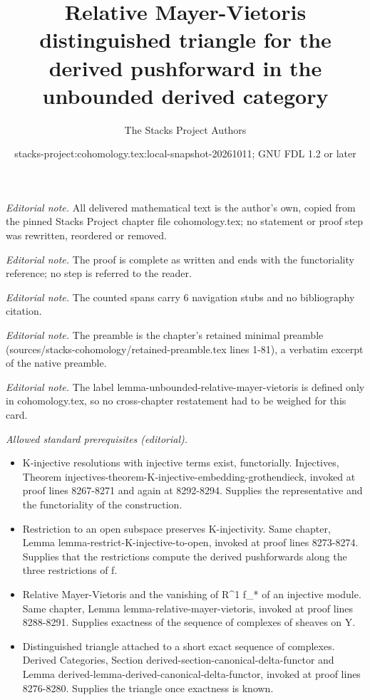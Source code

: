 \documentclass[10pt,a4paper]{amsart}
\title{Relative Mayer-Vietoris distinguished triangle for the derived pushforward in the unbounded derived category}
\author{The Stacks Project Authors}
\date{stacks-project:cohomology.tex:local-snapshot-20261011; GNU FDL 1.2 or later}
\theoremstyle{plain}
\theoremstyle{definition}
\theoremstyle{remark}
\numberwithin{equation}{subsection}
\begin{document}
\maketitle
\noindent\textit{Editorial note.} All delivered mathematical text is the author's own, copied from the pinned Stacks Project chapter file cohomology.tex; no statement or proof step was rewritten, reordered or removed.\par\medskip
\noindent\textit{Editorial note.} The proof is complete as written and ends with the functoriality reference; no step is referred to the reader.\par\medskip
\noindent\textit{Editorial note.} The counted spans carry 6 navigation stubs and no bibliography citation.\par\medskip
\noindent\textit{Editorial note.} The preamble is the chapter's retained minimal preamble (sources/stacks-cohomology/retained-preamble.tex lines 1-81), a verbatim excerpt of the native preamble.\par\medskip
\noindent\textit{Editorial note.} The label lemma-unbounded-relative-mayer-vietoris is defined only in cohomology.tex, so no cross-chapter restatement had to be weighed for this card.\par\medskip
\noindent\textit{Allowed standard prerequisites (editorial).}\begin{itemize}
\item K-injective resolutions with injective terms exist, functorially. Injectives, Theorem injectives-theorem-K-injective-embedding-grothendieck, invoked at proof lines 8267-8271 and again at 8292-8294. Supplies the representative and the functoriality of the construction.
\item Restriction to an open subspace preserves K-injectivity. Same chapter, Lemma lemma-restrict-K-injective-to-open, invoked at proof lines 8273-8274. Supplies that the restrictions compute the derived pushforwards along the three restrictions of f.
\item Relative Mayer-Vietoris and the vanishing of R\textasciicircum{}1 f\_* of an injective module. Same chapter, Lemma lemma-relative-mayer-vietoris, invoked at proof lines 8288-8291. Supplies exactness of the sequence of complexes of sheaves on Y.
\item Distinguished triangle attached to a short exact sequence of complexes. Derived Categories, Section derived-section-canonical-delta-functor and Lemma derived-lemma-derived-canonical-delta-functor, invoked at proof lines 8276-8280. Supplies the triangle once exactness is known.
\end{itemize}\medskip
\end{document}
